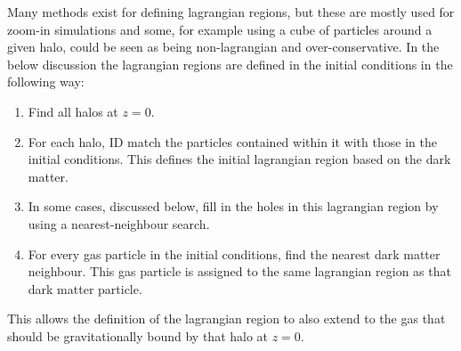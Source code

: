 Many methods exist for defining lagrangian regions, but these are mostly used for
zoom-in simulations and some, for example using a cube of particles around a given
halo, could be seen as being non-lagrangian and over-conservative. In the below
discussion the lagrangian regions are defined in the initial conditions in the
following way:
\begin{enumerate}
	\item Find all halos at $z=0$.

    \item For each halo, ID match the particles contained within it with those
		  in the initial conditions. This defines the initial lagrangian region
		  based on the dark matter.

	\item In some cases, discussed below, fill in the holes in this lagrangian
	      region by using a nearest-neighbour search.

	\item For every gas particle in the initial conditions, find the nearest dark
	      matter neighbour. This gas particle is assigned to the same lagrangian
	      region as that dark matter particle.
\end{enumerate}
This allows the definition of the lagrangian region to also extend to the gas
that should be gravitationally bound by that halo at $z=0$.